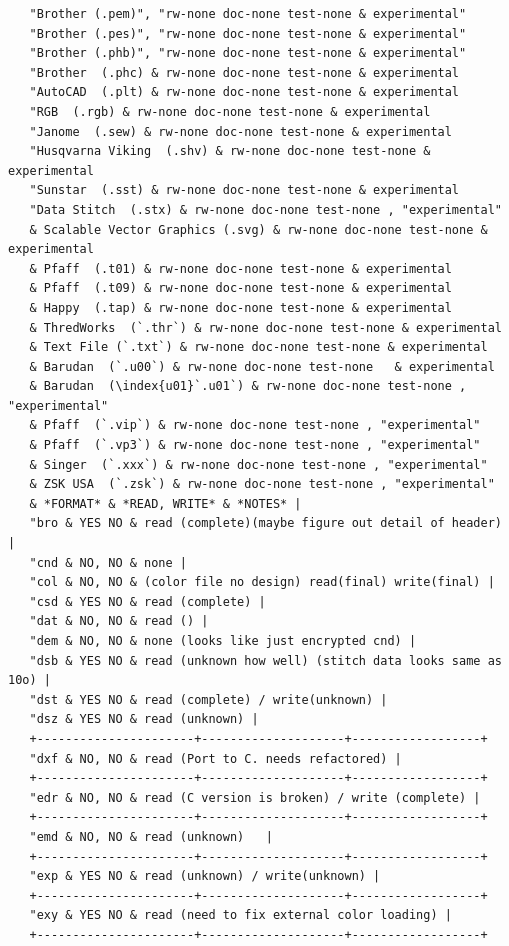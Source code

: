 \documentclass[10pt]{report}
\begin{document}
\begin{verbatim}
   "Brother (.pem)", "rw-none doc-none test-none & experimental"
   "Brother (.pes)", "rw-none doc-none test-none & experimental"
   "Brother (.phb)", "rw-none doc-none test-none & experimental"
   "Brother  (.phc) & rw-none doc-none test-none & experimental
   "AutoCAD  (.plt) & rw-none doc-none test-none & experimental
   "RGB  (.rgb) & rw-none doc-none test-none & experimental
   "Janome  (.sew) & rw-none doc-none test-none & experimental
   "Husqvarna Viking  (.shv) & rw-none doc-none test-none & experimental
   "Sunstar  (.sst) & rw-none doc-none test-none & experimental
   "Data Stitch  (.stx) & rw-none doc-none test-none , "experimental"
   & Scalable Vector Graphics (.svg) & rw-none doc-none test-none & experimental
   & Pfaff  (.t01) & rw-none doc-none test-none & experimental
   & Pfaff  (.t09) & rw-none doc-none test-none & experimental
   & Happy  (.tap) & rw-none doc-none test-none & experimental
   & ThredWorks  (`.thr`) & rw-none doc-none test-none & experimental
   & Text File (`.txt`) & rw-none doc-none test-none & experimental
   & Barudan  (`.u00`) & rw-none doc-none test-none   & experimental
   & Barudan  (\index{u01}`.u01`) & rw-none doc-none test-none , "experimental"
   & Pfaff  (`.vip`) & rw-none doc-none test-none , "experimental"
   & Pfaff  (`.vp3`) & rw-none doc-none test-none , "experimental"
   & Singer  (`.xxx`) & rw-none doc-none test-none , "experimental"
   & ZSK USA  (`.zsk`) & rw-none doc-none test-none , "experimental"
   & *FORMAT* & *READ, WRITE* & *NOTES* |
   "bro & YES NO & read (complete)(maybe figure out detail of header) |
   "cnd & NO, NO & none |
   "col & NO, NO & (color file no design) read(final) write(final) |
   "csd & YES NO & read (complete) |
   "dat & NO, NO & read () |
   "dem & NO, NO & none (looks like just encrypted cnd) |
   "dsb & YES NO & read (unknown how well) (stitch data looks same as 10o) |
   "dst & YES NO & read (complete) / write(unknown) |
   "dsz & YES NO & read (unknown) |
   +----------------------+--------------------+------------------+
   "dxf & NO, NO & read (Port to C. needs refactored) |
   +----------------------+--------------------+------------------+
   "edr & NO, NO & read (C version is broken) / write (complete) |
   +----------------------+--------------------+------------------+
   "emd & NO, NO & read (unknown)   |
   +----------------------+--------------------+------------------+
   "exp & YES NO & read (unknown) / write(unknown) |
   +----------------------+--------------------+------------------+
   "exy & YES NO & read (need to fix external color loading) |
   +----------------------+--------------------+------------------+

\end{verbatim}
\end{document}
